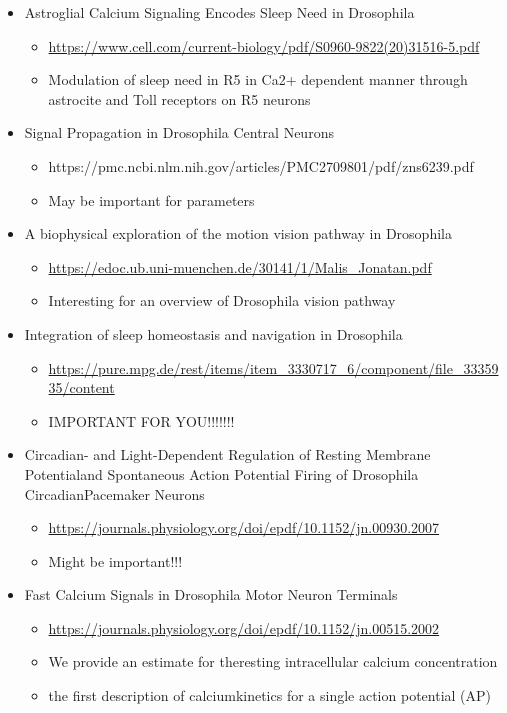 \documentclass[../workflow.tex]{subfiles}
\begin{document}
\begin{itemize}
    \item Astroglial Calcium Signaling Encodes Sleep Need in Drosophila
    \begin{itemize}
        \item \url{https://www.cell.com/current-biology/pdf/S0960-9822(20)31516-5.pdf}
        \item Modulation of sleep need in R5 in Ca2+ dependent manner through astrocite and Toll receptors on R5 neurons
    \end{itemize}

    \item Signal Propagation in Drosophila Central Neurons
    \begin{itemize}
        \item https://pmc.ncbi.nlm.nih.gov/articles/PMC2709801/pdf/zns6239.pdf
        \item May be important for parameters
    \end{itemize}

    \item A biophysical exploration of the motion vision pathway in Drosophila
    \begin{itemize}
        \item \url{https://edoc.ub.uni-muenchen.de/30141/1/Malis_Jonatan.pdf}
        \item Interesting for an overview of Drosophila vision pathway
    \end{itemize}

    \item Integration of sleep homeostasis and navigation in Drosophila
    \begin{itemize}
        \item \url{https://pure.mpg.de/rest/items/item_3330717_6/component/file_3335935/content}
        \item IMPORTANT FOR YOU!!!!!!!
    \end{itemize}

    \item Circadian- and Light-Dependent Regulation of Resting Membrane Potentialand Spontaneous Action Potential Firing of Drosophila CircadianPacemaker Neurons
    \begin{itemize}
        \item \url{https://journals.physiology.org/doi/epdf/10.1152/jn.00930.2007}
        \item Might be important!!!
    \end{itemize}

    \item Fast Calcium Signals in Drosophila Motor Neuron Terminals
    \begin{itemize}
        \item \url{https://journals.physiology.org/doi/epdf/10.1152/jn.00515.2002}
        \item We provide an estimate for theresting intracellular calcium concentration
        \item the ﬁrst description of calciumkinetics for a single action potential (AP)
    \end{itemize}


\end{itemize}
\end{document}
